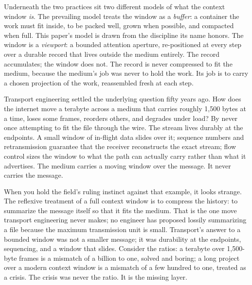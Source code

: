 \documentclass[11pt, a4paper]{article}
\begin{document}
Underneath the two practices sit two different models of what the context window
\emph{is}. The prevailing model treats the window as a \emph{buffer}: a container the
work must fit inside, to be packed well, grown when possible, and compacted when full.
This paper's model is drawn from the discipline its name honors. The window is a
\emph{viewport}: a bounded attention aperture, re-positioned at every step over a durable
record that lives outside the medium entirely. The record accumulates; the window does
not. The record is never compressed to fit the medium, because the medium's job was
never to hold the work. Its job is to carry a chosen projection of the work, reassembled
fresh at each step.

Transport engineering settled the underlying question fifty years ago. How does the
internet move a terabyte across a medium that carries roughly 1,500 bytes at a time,
loses some frames, reorders others, and degrades under load? By never once attempting to
fit the file through the wire. The stream lives durably at the endpoints. A small window
of in-flight data slides over it; sequence numbers and retransmission guarantee that the
receiver reconstructs the exact stream; flow control sizes the window to what the path
can actually carry rather than what it advertises. The medium carries a moving window
over the message. It never carries the message.

When you hold the field's ruling instinct against that example, it looks strange. The reflexive
treatment of a full context window is to compress the history: to summarize the message
itself so that it fits the medium. That is the one move transport engineering never
makes; no engineer has proposed lossily summarizing a file because the maximum
transmission unit is small. Transport's answer to a bounded window was not a smaller
message; it was durability at the endpoints, sequencing, and a window that slides. Consider
the ratios: a terabyte over 1,500-byte frames is a mismatch of a
billion to one, solved and boring; a long project over a modern context window is a
mismatch of a few hundred to one, treated as a crisis. The crisis was never the ratio.
It is the missing layer.
\end{document}
